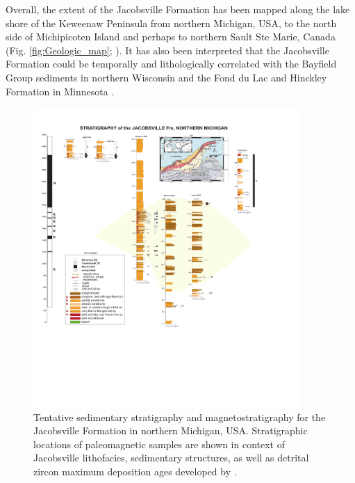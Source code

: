 \documentclass[draft]{agujournal2019}
\begin{document}
Overall, the extent of the Jacobsville Formation has been mapped along the lake shore of the Keweenaw Peninsula from northern Michigan, USA, to the north side of Michipicoten Island and perhaps to northern Sault Ste Marie, Canada (Fig. \ref{fig:Geologic_map}; ). It has also been interpreted that the Jacobsville Formation could be temporally and lithologically correlated with the Bayfield Group sediments in northern Wisconsin and the Fond du Lac and Hinckley Formation in Minnesota \cite{Hamblin1958a, Kalliokoski1982a, Malone2016a}.


\begin{figure}[h!]
\centering
\includegraphics[width=0.9\textwidth]{Jacobsville_Sections_v3.pdf}
\caption{Tentative sedimentary stratigraphy and magnetostratigraphy for the Jacobsville Formation in northern Michigan, USA. Stratigraphic locations of paleomagnetic samples are shown in context of Jacobsville lithofacies, sedimentary structures, as well as detrital zircon maximum deposition ages developed by . }
\label{fig:strat_column}
\end{figure}
\end{document}
